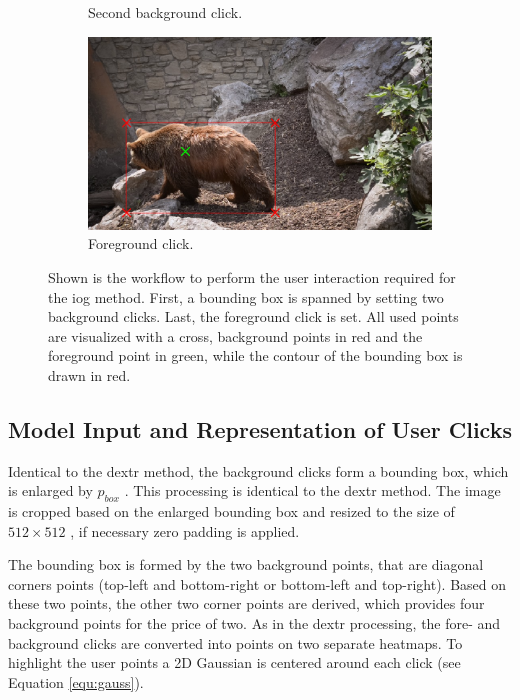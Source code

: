 \begin{figure}
\begin{subfigure}[b]{0.3\textwidth}
		\caption{Second background click.}
		\label{fig:ch3:sec4:iog_workflow_2}
	\end{subfigure}
	\hfill
	\begin{subfigure}[b]{0.3\textwidth}
		\centering
		\includegraphics[width=\textwidth]{figures/chap34_bear_5.png}
		\caption{Foreground click.}
		\label{fig:ch3:sec4:iog_workflow_3}
	\end{subfigure}
	\caption[IOG User Interaction]{
		Shown is the workflow to perform the user interaction required for the \gls{iog} method.
		First, a bounding box is spanned by setting two background clicks.
		Last, the foreground click is set.
		All used points are visualized with a cross, background points in red and the foreground point in green, while the contour of the bounding box is drawn in red.
	} 
	\label{fig:ch3:sec4:iog_user_clicks}
\end{figure}

\subsection{Model Input and Representation of User Clicks}\label{ord:ch3:sec4:subsec2}

Identical to the \gls{dextr} method, the background clicks form a bounding box, which is enlarged by  $p_{{box}}$ .
This processing is identical to the \gls{dextr} method.
The image is cropped based on the enlarged bounding box and resized to the size of $512 \times 512$ , if necessary zero padding is applied.

The bounding box is formed by the two background points, that are diagonal corners points (top-left and bottom-right or bottom-left and top-right).
Based on these two points, the other two corner points are derived, which provides four background points for the price of two.
As in the \gls{dextr} processing, the fore- and background clicks are converted into points on two separate heatmaps.
To highlight the user points a 2D Gaussian is centered around each click (see Equation \ref{equ:gauss}).

